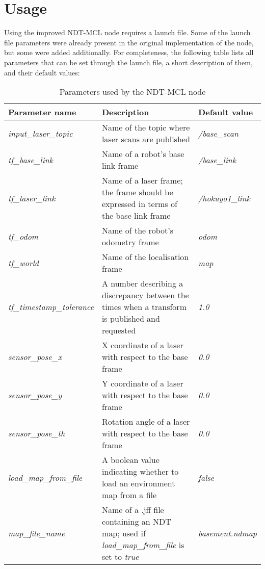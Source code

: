 \documentclass[12pt]{article}
\begin{document}
	

	\section{Usage}
	\label{sec:usage}

	Using the improved NDT-MCL node requires a launch file. Some of the launch file parameters were already present in the original implementation of the node, but some were added additionally. For completeness, the following table lists all parameters that can be set through the launch file, a short description of them, and their default values:
	\begin{table}[H]
		\caption{Parameters used by the NDT-MCL node}
		\centering
		\begin{tabular}{|p{4cm}|p{7.2cm}|p{4cm}|}
			\hline
			{\bf Parameter name} & {\bf Description} & {\bf Default value} \\\hline
			{\it input\_laser\_topic} & Name of the topic where laser scans are published & {\it /base\_scan} \\\hline
			{\it tf\_base\_link} & Name of a robot's base link frame & {\it /base\_link} \\\hline
			{\it tf\_laser\_link} & Name of a laser frame; the frame should be expressed in terms of the base link frame & {\it /hokuyo1\_link} \\\hline
			{\it tf\_odom} & Name of the robot's odometry frame & {\it odom} \\\hline
			{\it tf\_world} & Name of the localisation frame & {\it map} \\\hline
			{\it tf\_timestamp\_tolerance} & A number describing a discrepancy between the times when a transform is published and requested & {\it 1.0} \\\hline
			{\it sensor\_pose\_x} & X coordinate of a laser with respect to the base frame & {\it 0.0} \\\hline
			{\it sensor\_pose\_y} & Y coordinate of a laser with respect to the base frame & {\it 0.0} \\\hline
			{\it sensor\_pose\_th} & Rotation angle of a laser with respect to the base frame & {\it 0.0} \\\hline
			{\it load\_map\_from\_file} & A boolean value indicating whether to load an environment map from a file & {\it false} \\\hline
			{\it map\_file\_name} & Name of a .jff file containing an NDT map; used if {\it load\_map\_from\_file} is set to {\it true} & {\it basement.ndmap} \\\hline

\end{tabular}
\end{table}
\end{document}
